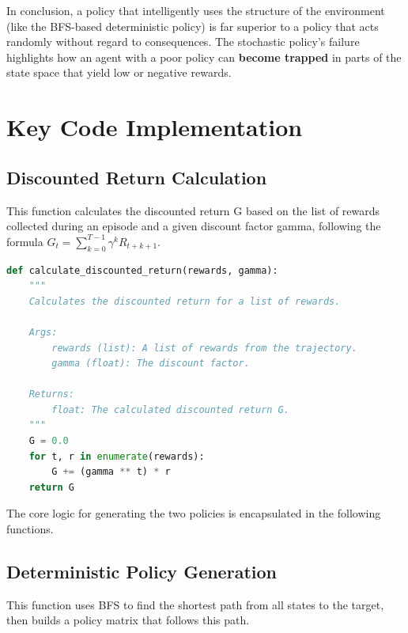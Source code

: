 \documentclass[12pt]{article}
\begin{document}
In conclusion, a policy that intelligently uses the structure of the environment (like the BFS-based deterministic policy) is far superior to a policy that acts randomly without regard to consequences. The stochastic policy's failure highlights how an agent with a poor policy can \textbf{become trapped} in parts of the state space that yield low or negative rewards.





\newpage

\section{Key Code Implementation}

\subsection{Discounted Return Calculation}
This function calculates the discounted return G based on the list of rewards collected during an episode and a given discount factor gamma, following the formula $G_t = \sum_{k=0}^{T-1} \gamma^k R_{t+k+1}$.

\begin{lstlisting}[language=Python, caption={Code for calculating the discounted return.}]
def calculate_discounted_return(rewards, gamma):
    """
    Calculates the discounted return for a list of rewards.

    Args:
        rewards (list): A list of rewards from the trajectory.
        gamma (float): The discount factor.

    Returns:
        float: The calculated discounted return G.
    """
    G = 0.0
    for t, r in enumerate(rewards):
        G += (gamma ** t) * r
    return G
\end{lstlisting}

The core logic for generating the two policies is encapsulated in the following functions.

\subsection{Deterministic Policy Generation}
This function uses BFS to find the shortest path from all states to the target, then builds a policy matrix that follows this path.
\end{document}
